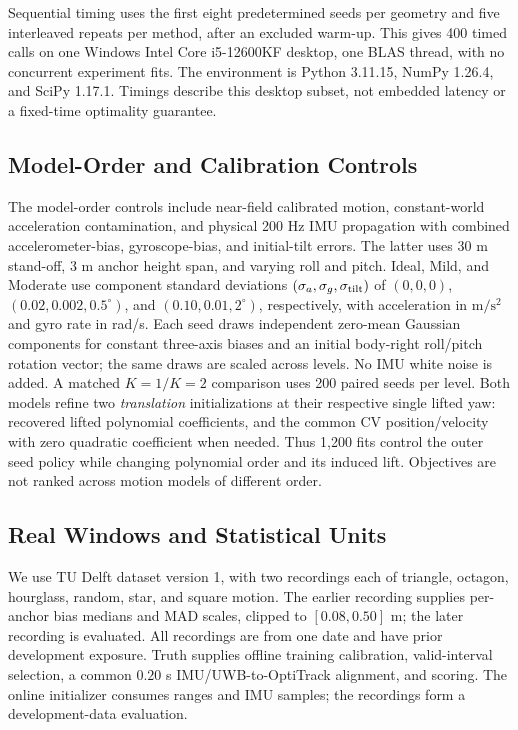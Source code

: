 \documentclass[conference,letterpaper,10pt]{IEEEtran}
\begin{document}
Sequential timing uses the first eight predetermined seeds per geometry and five interleaved repeats per method, after an excluded warm-up. This gives 400 timed calls on one Windows Intel Core i5-12600KF desktop, one BLAS thread, with no concurrent experiment fits. The environment is Python 3.11.15, NumPy 1.26.4, and SciPy 1.17.1. Timings describe this desktop subset, not embedded latency or a fixed-time optimality guarantee.

\subsection{Model-Order and Calibration Controls}
The model-order controls include near-field calibrated motion, constant-world acceleration contamination, and physical 200 Hz IMU propagation with combined accelerometer-bias, gyroscope-bias, and initial-tilt errors. The latter uses 30 m stand-off, 3 m anchor height span, and varying roll and pitch. Ideal, Mild, and Moderate use component standard deviations $(\sigma_a,\sigma_g,\sigma_{\rm tilt})$ of $(0,0,0)$, $(0.02,0.002,0.5^\circ)$, and $(0.10,0.01,2^\circ)$, respectively, with acceleration in $\mathrm{m/s^2}$ and gyro rate in rad/s. Each seed draws independent zero-mean Gaussian components for constant three-axis biases and an initial body-right roll/pitch rotation vector; the same draws are scaled across levels. No IMU white noise is added. A matched $K=1/K=2$ comparison uses 200 paired seeds per level. Both models refine two \emph{translation} initializations at their respective single lifted yaw: recovered lifted polynomial coefficients, and the common CV position/velocity with zero quadratic coefficient when needed. Thus 1,200 fits control the outer seed policy while changing polynomial order and its induced lift. Objectives are not ranked across motion models of different order.

\subsection{Real Windows and Statistical Units}\label{sec:realwindowprotocol}
We use TU Delft dataset version 1\cite{pfeifferdata2021}, with two recordings each of triangle, octagon, hourglass, random, star, and square motion. The earlier recording supplies per-anchor bias medians and MAD scales, clipped to $[0.08,0.50]$ m; the later recording is evaluated. All recordings are from one date and have prior development exposure. Truth supplies offline training calibration, valid-interval selection, a common $0.20$ s IMU/UWB-to-OptiTrack alignment, and scoring. The online initializer consumes ranges and IMU samples; the recordings form a development-data evaluation.
\end{document}
